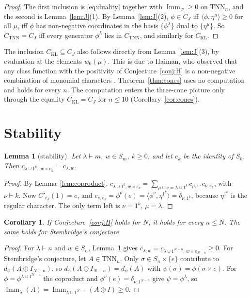 \documentclass[11pt]{amsart}
\newtheorem{lemma}[theorem]{Lemma}
\newtheorem{corollary}[theorem]{Corollary}
\theoremstyle{definition}
\theoremstyle{remark}
\newcommand{\Imm}{\operatorname{Imm}}
\newcommand{\TNN}{\mathrm{TNN}}
\newcommand{\CKL}{C_{\mathrm{KL}}}
\newcommand{\CTNN}{C_{\mathrm{TNN}}}
\newcommand{\CJ}{C_{J}}
\newcommand{\Cp}[1]{C'_{#1}(1)}
\begin{document}
\begin{proof}
The first inclusion is \eqref{eq:duality} together with $\Imm_w\ge0$ on $\TNN_n$, and the second is Lemma~\ref{lem:J}(1). By Lemma~\ref{lem:J}(2), $\phi\in\CJ$ iff $\langle\phi,\eta^\mu\rangle\ge0$ for all $\mu$, iff $\phi$ has non-negative coordinates in the basis $\{\phi^\lambda\}$ dual to $\{\eta^\mu\}$. So $\CTNN=\CJ$ iff every generator $\phi^\lambda$ lies in $\CTNN$, and similarly for $\CKL$.
\end{proof}

The inclusion $\CKL\subseteq\CJ$ also follows directly from Lemma~\ref{lem:J}(3), by evaluation at the elements $w_0(\mu)$. This is due to Haiman, who observed that any class function with the positivity of Conjecture~\ref{conj:H} is a non-negative combination of monomial characters \cite[\S2 and Prop.~4.1(1)]{Hai}. Theorem~\ref{thm:cones} uses no computation and holds for every $n$. The computation enters the three-cone picture only through the equality $\CKL=\CJ$ for $n\le10$ (Corollary~\ref{cor:cones}).

\section{Stability}\label{sec:stability}

\begin{lemma}[stability]\label{lem:stability}
Let $\lambda\vdash m$, $w\in S_m$, $k\ge0$, and let $e_k$ be the identity of $S_k$. Then $c_{\lambda\cup1^k,\;w\times e_k}=c_{\lambda,w}$.
\end{lemma}

\begin{proof}
By Lemma~\ref{lem:coproduct}, $c_{\lambda\cup1^k,w\times e_k}=\sum_{\mu\cup\nu=\lambda\cup1^k}c_{\mu,w}\,c_{\nu,e_k}$, with $\nu\vdash k$. Now $\Cp{e_k}=e$, and $c_{\nu,e_k}=\phi^\nu(e)=\langle\phi^\nu,\eta^{1^k}\rangle=\delta_{\nu,1^k}$, because $\eta^{1^k}$ is the regular character. The only term left is $\nu=1^k$, $\mu=\lambda$.
\end{proof}

\begin{corollary}\label{cor:down}
If Conjecture~\ref{conj:H} holds for $N$, it holds for every $n\le N$. The same holds for Stembridge's conjecture.
\end{corollary}

\begin{proof}
For $\lambda\vdash n$ and $w\in S_n$, Lemma~\ref{lem:stability} gives $c_{\lambda,w}=c_{\lambda\cup1^{N-n},\,w\times e_{N-n}}\ge0$. For Stembridge's conjecture, let $A\in\TNN_n$. Only $\sigma\in S_n\times\{e\}$ contribute to $d_\phi(A\oplus I_{N-n})$, so $d_\phi(A\oplus I_{N-n})=d_{\psi}(A)$ with $\psi(\sigma)=\phi(\sigma\times e)$. For $\phi=\phi^{\lambda\cup1^{N-n}}$ the coproduct and $\phi^\nu(e)=\delta_{\nu,1^{N-n}}$ give $\psi=\phi^\lambda$, so $\Imm_\lambda(A)=\Imm_{\lambda\cup1^{N-n}}(A\oplus I)\ge0$.
\end{proof}
\end{document}
